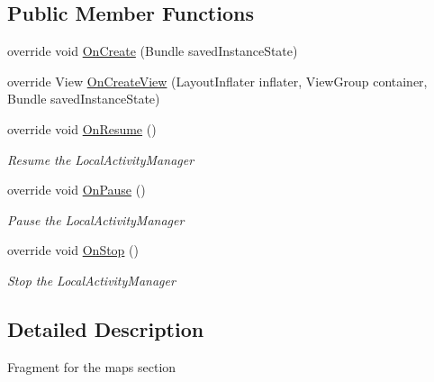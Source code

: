 \subsection*{Public Member Functions}
\begin{DoxyCompactItemize}
\item 
override void \hyperlink{class_field_service_1_1_android_1_1_fragments_1_1_map_fragment_ae0790dc1bc85469dfd384400c1212f4b}{On\+Create} (Bundle saved\+Instance\+State)
\item 
override View \hyperlink{class_field_service_1_1_android_1_1_fragments_1_1_map_fragment_a85552d56f6e71db6118cc76fc3687a8d}{On\+Create\+View} (Layout\+Inflater inflater, View\+Group container, Bundle saved\+Instance\+State)
\item 
override void \hyperlink{class_field_service_1_1_android_1_1_fragments_1_1_map_fragment_a3ec342e2c4e15db2f18f2b5e51ce3716}{On\+Resume} ()
\begin{DoxyCompactList}\small\item\em Resume the Local\+Activity\+Manager \end{DoxyCompactList}\item 
override void \hyperlink{class_field_service_1_1_android_1_1_fragments_1_1_map_fragment_abd7b00092fd02e69584922b390a5792e}{On\+Pause} ()
\begin{DoxyCompactList}\small\item\em Pause the Local\+Activity\+Manager \end{DoxyCompactList}\item 
override void \hyperlink{class_field_service_1_1_android_1_1_fragments_1_1_map_fragment_a66a01bd2327b59c791035075ce5137a7}{On\+Stop} ()
\begin{DoxyCompactList}\small\item\em Stop the Local\+Activity\+Manager \end{DoxyCompactList}\end{DoxyCompactItemize}


\subsection{Detailed Description}
Fragment for the maps section 



